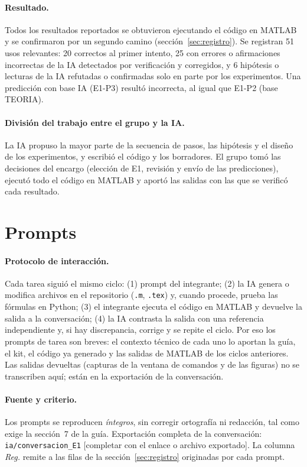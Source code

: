 \documentclass[11pt,a4paper]{article}
\begin{document}
\paragraph{Resultado.}
Todos los resultados reportados se obtuvieron ejecutando el código en MATLAB y se confirmaron por un
segundo camino (sección~\ref{sec:registro}). Se registran 51 usos relevantes: 20 correctos al primer
intento, 25 con errores o afirmaciones incorrectas de la IA detectados por verificación y corregidos, y
6 hipótesis o lecturas de la IA refutadas o confirmadas solo en parte por los experimentos. Una predicción con
base IA (E1-P3) resultó incorrecta, al igual que E1-P2 (base TEORIA).

\paragraph{División del trabajo entre el grupo y la IA.}
La IA propuso la mayor parte de la secuencia de pasos, las hipótesis y el diseño de los experimentos, y
escribió el código y los borradores. El grupo tomó las decisiones del encargo (elección de E1, revisión y
envío de las predicciones), ejecutó todo el código en MATLAB y aportó las salidas con las que se
verificó cada resultado.

\section{Prompts}

\paragraph{Protocolo de interacción.}
Cada tarea siguió el mismo ciclo: (1) prompt del integrante; (2) la IA genera o modifica archivos en el
repositorio (\texttt{.m}, \texttt{.tex}) y, cuando procede, prueba las fórmulas en Python; (3) el integrante
ejecuta el código en MATLAB y devuelve la salida a la conversación; (4) la IA contrasta la salida con una
referencia independiente y, si hay discrepancia, corrige y se repite el ciclo. Por eso los prompts de
tarea son breves: el contexto técnico de cada uno lo aportan la guía, el kit, el código ya generado y las
salidas de MATLAB de los ciclos anteriores. Las salidas devueltas (capturas de la ventana de comandos y
de las figuras) no se transcriben aquí; están en la exportación de la conversación.

\paragraph{Fuente y criterio.}
Los prompts se reproducen \emph{íntegros}, sin corregir ortografía ni redacción, tal como exige la
sección~7 de la guía. Exportación completa de la conversación: \texttt{ia/conversacion\_E1}
{[completar con el enlace o archivo exportado]}. La columna \emph{Reg.} remite a las filas de la
sección~\ref{sec:registro} originadas por cada prompt.
\end{document}
